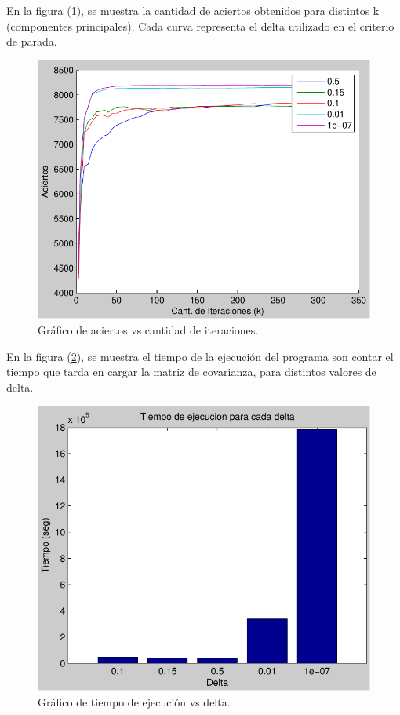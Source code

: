 

En la figura (\ref{fig:aciertos-vs-k}), se muestra la cantidad de aciertos obtenidos para distintos k (componentes principales). 
Cada curva representa el delta utilizado en el criterio de parada.


\begin{figure}[h]
\begin{center}
  \includegraphics[scale=0.8]{imagenes/aciertos.pdf}
\end{center}
\caption{Gráfico de aciertos vs cantidad de iteraciones.}
\label{fig:aciertos-vs-k}
\end{figure}

En la figura (\ref{fig:tiempo-vs-k}), se muestra el tiempo de la ejecución del programa son contar el tiempo que tarda en
cargar la matriz de covarianza, para distintos valores de delta.

\begin{figure}[h]
\begin{center}
  \includegraphics[scale=0.8]{imagenes/tiempos.pdf}
\end{center}
\caption{Gráfico de tiempo de ejecución vs delta.}
\label{fig:tiempo-vs-k}
\end{figure}